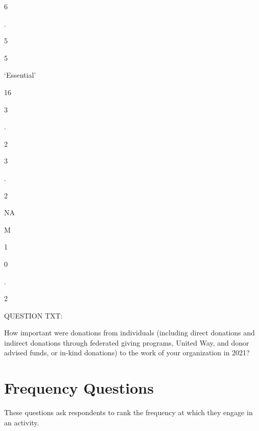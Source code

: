 \documentclass[
  letterpaper,
]{scrbook}
\begin{document}
6

.

5

5

`Essential'

16

3

.

2

3

.

2

NA

M

1

0

.

2

QUESTION TXT:

How important were donations from individuals (including direct
donations and indirect donations through federated giving programs,
United Way, and donor advised funds, or in-kind donations) to the work
of your organization in 2021?

\chapter{Frequency Questions}\label{frequency-questions-1}

These questions ask respondents to rank the frequency at which they
engage in an activity.
\end{document}
